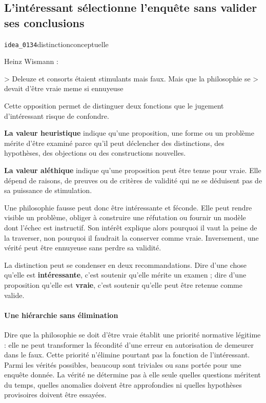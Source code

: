 \documentclass[10pt,a4paper]{article}
\begin{document}
\subsection{L'intéressant sélectionne l'enquête sans valider ses conclusions}
{\small\color{metadata} \texttt{idea\_0134}\quad\textbullet\quad distinction\quad\textbullet\quad conceptuelle\par}

Heinz Wismann :

> Deleuze et consorts étaient stimulants mais faux. Mais que la philosophie se > devait d'être vraie meme si ennuyeuse

Cette opposition permet de distinguer deux fonctions que le jugement d'intéressant risque de confondre.

\textbf{La valeur heuristique} indique qu'une proposition, une forme ou un problème mérite d'être examiné parce qu'il peut déclencher des distinctions, des hypothèses, des objections ou des constructions nouvelles.

\textbf{La valeur aléthique} indique qu'une proposition peut être tenue pour vraie. Elle dépend de raisons, de preuves ou de critères de validité qui ne se déduisent pas de sa puissance de stimulation.

Une philosophie fausse peut donc être intéressante et féconde. Elle peut rendre visible un problème, obliger à construire une réfutation ou fournir un modèle dont l'échec est instructif. Son intérêt explique alors pourquoi il vaut la peine de la traverser, non pourquoi il faudrait la conserver comme vraie. Inversement, une vérité peut être ennuyeuse sans perdre sa validité.

La distinction peut se condenser en deux recommandations. Dire d'une chose qu'elle est \textbf{intéressante}, c'est soutenir qu'elle mérite un examen ; dire d'une proposition qu'elle est \textbf{vraie}, c'est soutenir qu'elle peut être retenue comme valide.

\paragraph{Une hiérarchie sans élimination}
Dire que la philosophie se doit d'être vraie établit une priorité normative légitime : elle ne peut transformer la fécondité d'une erreur en autorisation de demeurer dans le faux. Cette priorité n'élimine pourtant pas la fonction de l'intéressant. Parmi les vérités possibles, beaucoup sont triviales ou sans portée pour une enquête donnée. La vérité ne détermine pas à elle seule quelles questions méritent du temps, quelles anomalies doivent être approfondies ni quelles hypothèses provisoires doivent être essayées.
\end{document}
